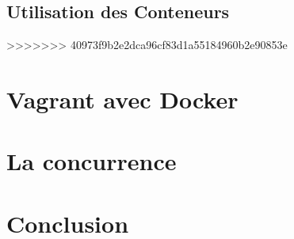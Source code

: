 \documentclass[12pt,a4paper]{article}
\begin{document}
\subsection{Utilisation des Conteneurs}

>>>>>>> 40973f9b2e2dca96cf83d1a55184960b2e90853e

\section{Vagrant avec Docker}

\section{La concurrence}

\section{Conclusion}
\end{document}
